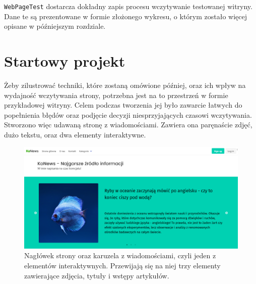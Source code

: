 \documentclass[licencjacka]{pracadypl}
\begin{document}
\texttt{WebPageTest} dostarcza dokładny zapis procesu wczytywanie testowanej witryny. Dane te są prezentowane w formie złożonego wykresu, o którym zostało więcej opisane w późniejszym rozdziale.


\section{Startowy projekt}
Żeby zilustrować techniki, które zostaną omówione później, oraz ich wpływ na wydajność wczytywania strony, potrzebna jest na to przestrzeń w formie przykładowej witryny. Celem podczas tworzenia jej było zawarcie łatwych do popełnienia błędów oraz podjęcie decyzji niesprzyjających czasowi wczytywania. Stworzono więc udawaną stronę z wiadomościami. Zawiera ona paręnaście zdjęć, dużo tekstu, oraz dwa elementy interaktywne. 

\begin{figure}[H]
  \includegraphics[width=\linewidth]{images/frontpage.png}
  \caption{Nagłówek strony oraz karuzela z wiadomościami, czyli jeden z elementów interaktywnych. Przewijają się na niej trzy elementy zawierające zdjęcia, tytuły i wstępy artykułów.}
  \label{fig:frontpage}
\end{figure}
\end{document}

